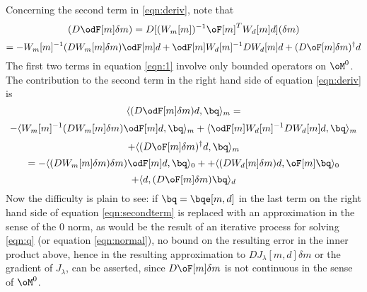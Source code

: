 Concerning the second term in \ref{eqn:deriv}, note that
\[
(D\odF[m]\delta m) = D[(W_m[m])^{-1}\oF[m]^TW_d[m]d](\delta m)
\]
\begin{equation}
\label{eqn:1}
=-W_m[m]^{-1}(DW_m[m]\delta m)\odF[m]d + \odF[m]W_d[m]^{-1}DW_d[m]d 
+ (D\oF[m]\delta m)^{\dagger}d
\end{equation}
The first two terms in equation \ref{eqn:1} involve only bounded
operators on $\oM^0$. The contribution to the second
term in the right hand side of equation \ref{eqn:deriv} is
\[
\langle (D\odF[m]\delta m)d,\bq\rangle_m =
\]
\[
- \langle W_m[m]^{-1}(DW_m[m]\delta m)\odF[m]d, \bq\rangle_m + 
\langle \odF[m]W_d[m]^{-1}DW_d[m]d,\bq\rangle_m
\]
\[
+ \langle (D\oF[m]\delta m)^{\dagger}d,\bq\rangle_m
\]
\[
= -\langle (DW_m[m]\delta m)\delta m)\odF[m]d,\bq\rangle_0 +
+ \langle (DW_d[m]\delta m)d,\oF[m]\bq\rangle_0
\]
\begin{equation}
\label{eqn:secondterm} 
+ \langle d, (D\oF[m]\delta m)\bq \rangle_d
\end{equation}
Now the difficulty is plain to see: if $\bq=\bqe[m,d]$ in the last
term on the right hand side of equation \ref{eqn:secondterm} is replaced with an
approximation in the sense of the $0$ norm, as would be the result of
an iterative process for solving \ref{eqn:q} (or equation
\ref{eqn:normal}), no bound on the resulting error in the inner
product above, hence in the resulting approximation to $DJ_{\lambda}[m,d]\delta
m$ or the gradient of $J_{\lambda}$, can be asserted, since $D\oF[m]\delta m$ is not continuous in the sense of $\oM^0$.

